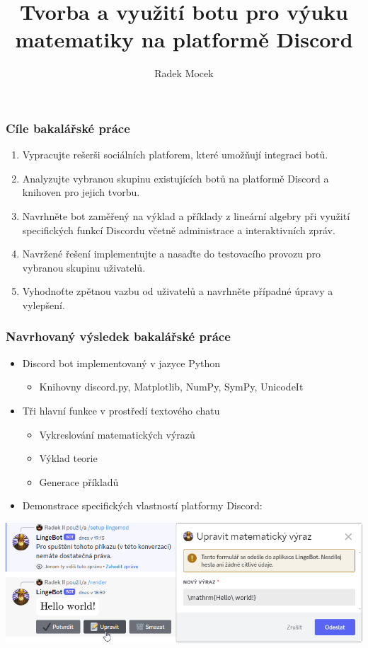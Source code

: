 \documentclass[FM]{tulpresentation}
\title{Tvorba a využití botu pro výuku matematiky na platformě Discord}
\author{Radek Mocek}
\institute{Ing. Igor Kopetschke}
\begin{document}
	\TULtitleframe
	
	\begin{frame}\frametitle{Cíle bakalářské práce}
		\begin{enumerate}
			\item Vypracujte rešerši sociálních platforem, které umožňují integraci botů.
			\item Analyzujte vybranou skupinu existujících botů na platformě Discord a knihoven pro jejich tvorbu.
			\item Navrhněte bot zaměřený na výklad a příklady z lineární algebry při využití specifických funkcí Discordu včetně administrace a interaktivních zpráv.
			\item Navržené řešení implementujte a nasaďte do testovacího provozu pro vybranou skupinu uživatelů.
			\item Vyhodnoťte zpětnou vazbu od uživatelů a navrhněte případné úpravy a vylepšení.
		\end{enumerate}
	\end{frame}
	
	\begin{frame}\frametitle{Navrhovaný výsledek bakalářské práce}
		\begin{itemize}
			\item Discord bot implementovaný v jazyce Python
			\begin{itemize}
				\item Knihovny discord.py, Matplotlib, NumPy, SymPy, UnicodeIt
			\end{itemize}
			\item Tři hlavní funkce v prostředí textového chatu
			\begin{itemize}
				\item Vykreslování matematických výrazů
				\item Výklad teorie
				\item Generace příkladů
			\end{itemize}
			\item Demonstrace specifických vlastností platformy Discord:			
		\end{itemize}
		\includegraphics[width=.95\paperwidth]{img/idk}
	\end{frame}
	
\end{document}
